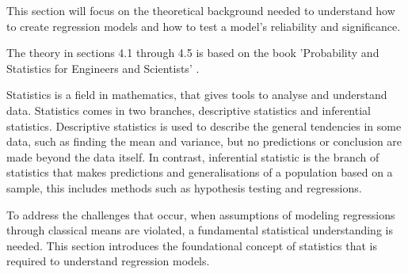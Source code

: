 This section will focus on the theoretical background needed to understand how to create regression models and how to test a model's reliability and significance.

\noindent The theory in sections 4.1 through 4.5 is based on the book 'Probability and Statistics for Engineers and Scientists' \cite{ProbAndStat}. \newline

\noindent Statistics is a field in mathematics, that gives tools to analyse and understand data. Statistics comes in two branches, descriptive statistics and inferential statistics. Descriptive statistics is used to describe the general tendencies in some data, such as finding the mean and variance, but no predictions or conclusion are made beyond the data itself. In contrast, inferential statistic is the branch of statistics that makes predictions and generalisations of a population based on a sample, this includes methods such as hypothesis testing and regressions. \newline

\noindent To address the challenges that occur, when  assumptions of modeling regressions through classical means are violated, a fundamental statistical understanding is needed. This section introduces the foundational concept of statistics that is required to understand regression models.






\newpage

